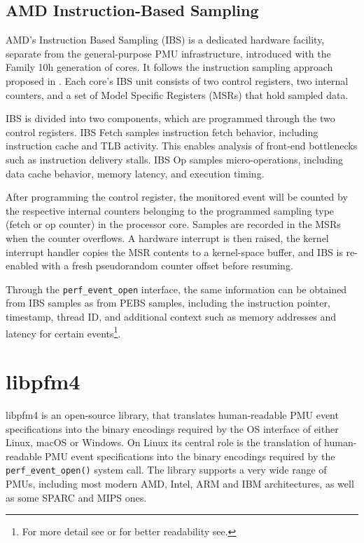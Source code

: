 \subsection{AMD Instruction-Based Sampling}
\label{subsec:ibs}

AMD's Instruction Based Sampling (IBS) is a dedicated hardware facility, separate from the general-purpose PMU infrastructure, introduced with the Family 10h generation of cores\cite{Drongowski2007,Greathouse2021}. It follows the instruction sampling approach proposed in \cite{Dean1997}. Each core's IBS unit consists of two control registers, two internal counters, and a set of Model Specific Registers (MSRs) that hold sampled data\cite{AMDManual}.

IBS is divided into two components, which are programmed through the two control registers. IBS Fetch samples instruction fetch behavior, including instruction cache and TLB activity. This enables analysis of front-end bottlenecks such as instruction delivery stalls. IBS Op samples micro-operations, including data cache behavior, memory latency, and execution timing.\cite{AMDManual}

After programming the control register, the monitored event will be counted by the respective internal counters belonging to the programmed sampling type (fetch or op counter) in the processor core. Samples are recorded in the MSRs when the counter overflows. A hardware interrupt is then raised, the kernel interrupt handler copies the MSR contents to a kernel-space buffer, and IBS is re-enabled with a fresh pseudorandom counter offset before resuming.\cite{AMDManual}

Through the \texttt{perf\_event\_open} interface, the same information can be obtained from IBS samples as from PEBS samples, including the instruction pointer, timestamp, thread ID, and additional context such as memory addresses and latency for certain events\footnote{For more detail see\cite{AMDManual} or for better readability see\cite{Greathouse2021}.}\cite{AMDManual}.

\section{libpfm4}\label{sec:libpfm4}
libpfm4 is an open-source library, that translates human-readable PMU event specifications into the binary encodings required by the OS interface of either Linux, macOS or Windows. On Linux its central role is the translation of human-readable PMU event specifications into the binary encodings required by the \texttt{perf\_event\_open()} system call. The library supports a very wide range of PMUs, including most modern AMD, Intel, ARM and IBM architectures, as well as some SPARC and MIPS ones.\cite{libpfm4,eranian2006perfmon2}

